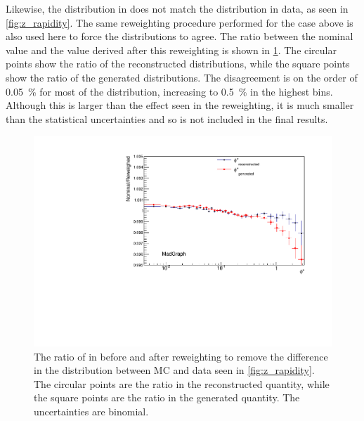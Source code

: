 Likewise, the \Z \rapidity distribution in \MADGRAPH does not match the
distribution in data, as seen in \cref{fig:z_rapidity}. The same reweighting
procedure performed for the \mee case above is also used here to force the
distributions to agree. The ratio between the nominal \phistar value and the
value derived after this reweighting is shown in
\cref{fig:z_rapidity_reweighted}. The circular points show the ratio of the
reconstructed \phistar distributions, while the square points show the ratio of
the generated \phistar distributions. The disagreement is on the order of
\SI{0.05}{\percent} for most of the distribution, increasing to
\SI{0.5}{\percent} in the highest \phistar bins. Although this is larger than
the effect seen in the \mee reweighting, it is much smaller than the
statistical uncertainties and so is not included in the final results.

\begin{figure}[!htbp]
    \centering
    \includegraphics[width=\textwidth]{figures/ZY_reweighed.pdf}
    \caption[
        The ratio of \phistar in \MADGRAPH before and after reweighting to
        remove the difference in the \rapidity distribution between MC and data.
    ]{
        The ratio of \phistar in \MADGRAPH before and after reweighting to
        remove the difference in the \rapidity distribution between MC and data
        seen in \cref{fig:z_rapidity}. The circular points are the ratio in
        the reconstructed quantity, while the square points are the ratio in
        the generated quantity. The uncertainties are binomial.
    }
    \label{fig:z_rapidity_reweighted}
\end{figure}

